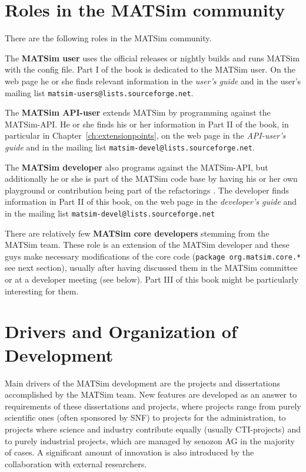 \section{Roles in the MATSim community}
\label{sec:roles}
There are the following roles in the MATSim community.
%
\begin{compactitem}
\item The \textbf{MATSim user} uses the official releases or nightly builds and runs MATSim with the config file. Part I of the book is dedicated to the MATSim user. On the web page he or she finds relevant information in the \emph{user's guide} and in the user's mailing list \lstinline|matsim-users@lists.sourceforge.net|.
\item The \textbf{MATSim API-user} extends MATSim by programming against the MATSim-API. He or she finds his or her information in Part II of the book, in particular in Chapter~\ref{ch:extensionpoints}, on the web page in the \emph{API-user's guide} and in the mailing list \lstinline|matsim-devel@lists.sourceforge.net|.
\item The \textbf{MATSim developer} also programs against the MATSim-API, but additionally he or she is part of the MATSim code base by having his or her own playground or contribution being part of the refactorings . The developer finds information in Part II of this book, on the web page in the \emph{developer's guide} and in the mailing list \lstinline|matsim-devel@lists.sourceforge.net| 
\item There are relatively few \textbf{MATSim core developers} stemming from the MATSim team. These role is an extension of the MATSim developer and these guys make necessary modifications of the core code (\lstinline|package org.matsim.core.*| see next section), usually after having discussed them in the MATSim committee or at a developer meeting (see below). Part III of this book might be particularly interesting for them.
\end{compactitem}
%
\section{Drivers and Organization of Development}
Main drivers of the MATSim development are the projects and dissertations accomplished by the MATSim team. New features are developed as an answer to requirements of these dissertations and projects, where projects range from purely scientific ones (often sponsored by SNF) to projects for the administration, to projects where science and industry contribute equally (usually CTI-projects) and to purely industrial projects, which are managed by senozon AG in the majority of cases. A significant amount of innovation is also introduced by the collaboration with external researchers.


